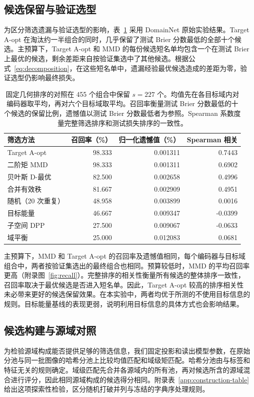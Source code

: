 \documentclass[UTF8,fontset=fandol,scheme=chinese,zihao=false,11pt,letterpaper]{ctexart}
\begin{document}
\subsection{候选保留与验证选型}
为区分筛选遗漏与验证选型的影响，表~\ref{tab:primary} 采用 DomainNet 原始实验结果。Target A-opt 在淘汰约一半组合的同时，几乎保留了测试 Brier 分数最低的全部十个候选。主预算下，Target A-opt 和 MMD 的每份候选短名单均包含一个在测试 Brier 上最优的候选，剩余差距来自按验证集选中了其他候选。根据公式~\eqref{eq:decomposition}，在这些短名单中，遗漏经验最优候选造成的差距为零，验证选型仍影响最终损失。

\begin{table}[t]
\centering
\caption{固定几何排序的对照在 455 个组合中保留 $s=227$ 个。均值先在各目标域内对编码器取平均，再对六个目标域取平均。召回率衡量测试 Brier 分数最低的十个候选的保留比例，遗憾值以测试 Brier 分数最低者为参照。Spearman 系数度量完整筛选排序和测试损失排序的一致性。}
\label{tab:primary}
\begin{tabular}{lrrr}
\toprule
筛选方法 & 召回率（\%） & 归一化遗憾值（\%） & Spearman 相关\\
\midrule
Target A-opt & 98.333 & 0.001311 & 0.7443 \\
二阶矩 MMD & 98.333 & 0.001311 & 0.6902 \\
贝叶斯 D-最优 & 82.500 & 0.002658 & 0.4996 \\
合并有效秩 & 81.667 & 0.002909 & 0.4951 \\
随机（20 次重复） & 48.958 & 0.003899 & 0.0016 \\
目标能量 & 46.667 & 0.009347 & -0.0399 \\
子空间 DPP & 27.500 & 0.009067 & -0.0633 \\
域平衡 & 25.000 & 0.012083 & 0.0681 \\
\bottomrule
\end{tabular}
\end{table}

主预算下，MMD 和 Target A-opt 的召回率及遗憾值相同，每个编码器与目标域组合中，两者按验证集选出的最终组合也相同。预算较低时，MMD 的平均召回率更高（附录图~\ref{fig:recall}）。完整排序的相关性衡量所有候选的整体排序一致性，召回率取决于最优候选是否进入短名单。因此，Target A-opt 较高的排序相关性未必带来更好的候选保留效果。在本实验中，两者均优于所测的不使用目标信息的规则。目标能量基线的表现更弱，说明利用目标信息的具体方式也会影响结果。

\subsection{候选构建与源域对照}
\label{sec:construction}
为检验源域构成能否提供足够的筛选信息，我们固定投影和读出模型参数，在原始分池与同一批图像的哈希分池上比较均值匹配和域级矩匹配。哈希分池由与标签和特征无关的规则确定。域级匹配先合并各源域内的所有池，再对候选所含的源域混合进行评分，因此相同源域构成的候选得分相同。附录表~\ref{app:construction-table} 给出这项探索性检验，区分随机打破并列与冻结的字典序处理规则。
\end{document}
